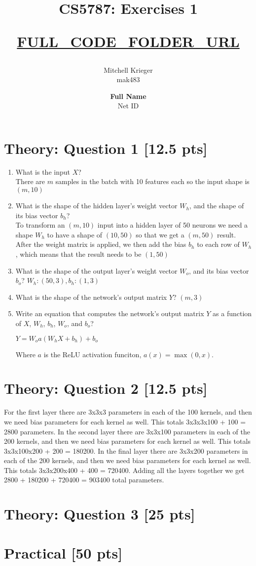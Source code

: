 \documentclass{article}
\title{CS5787: Exercises 1 \\ \begin{small}\url{FULL_CODE_FOLDER_URL}\end{small}}
\author{Mitchell Krieger \\ mak483 \and \textbf{Full Name} \\ Net ID}
\date{}
\begin{document}
\maketitle

\section{Theory: Question 1 [12.5 pts]}

\begin{enumerate}[label=\alph*)]
    \item What is the input $X$? \\ There are $m$ samples in the batch with 10 features each so the input shape is $(m, 10)$ 
    \item What is the shape of the hidden layer's weight vector $W_h$, and the shape of its bias vector $b_h$? \\ To transform an $(m, 10)$ input into a hidden layer of 50 neurons we need a shape $W_h$ to have a shape of $(10, 50)$ so that we get a $(m, 50)$ result. After the weight matrix is applied, we then add the bias $b_h$ to each row of $W_h$, which means that the result needs to be $(1, 50)$
    \item What is the shape of the output layer's weight vector $W_o$, and its bias vector $b_o$? $W_h: (50, 3), b_h: (1, 3)$
    \item What is the shape of the network's output matrix $Y$? $(m, 3)$
    \item Write an equation that computes the network's output matrix $Y$ as a function of $X$, $W_h$, $b_h$, $W_o$, and $b_o$?
    
          $Y = W_oa(W_hX+b_h)+b_o$ 

          Where $a$ is the ReLU activation funciton, $a(x) = \max(0,x)$.
\end{enumerate}

\section{Theory: Question 2 [12.5 pts]}

For the first layer there are 3x3x3 parameters in each of the 100 kernels, and then we need bias parameters for each kernel as well. This totals 3x3x3x100 + 100 = 2800 parameters.
In the second layer there are 3x3x100 parameters in each of the 200 kernels, and then we need bias parameters for each kernel as well. This totals 3x3x100x200 + 200 = 180200.
In the final layer there are 3x3x200 parameters in each of the 200 kernels, and then we need bias parameters for each kernel as well. This totals 3x3x200x400 + 400 = 720400.
Adding all the layers together we get 2800 + 180200 + 720400 = 903400 total parameters.

\section{Theory: Question 3 [25 pts]}

\section{Practical [50 pts]}
\end{document}
